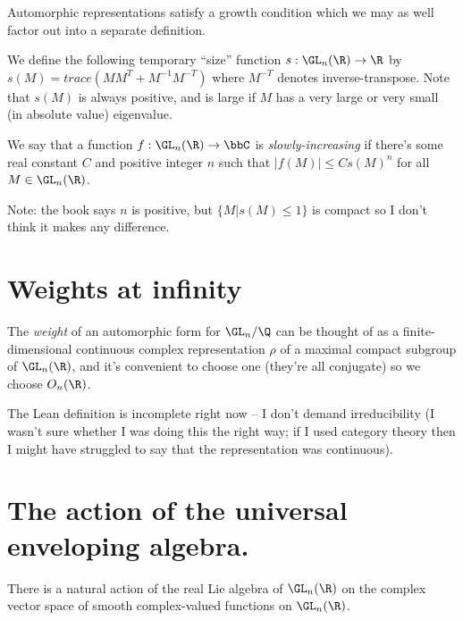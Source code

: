 Automorphic representations satisfy a growth condition which we may as well factor out
into a separate definition.

We define the following temporary ``size'' function $s:\GL_n(\R)\to\R$ by
$s(M)=trace(MM^T+M^{-1}M^{-T})$ where $M^{-T}$ denotes inverse-transpose. Note that
$s(M)$ is always positive, and is large if $M$ has a very large or very small
(in absolute value) eigenvalue.

\begin{definition}
  \label{AutomorphicForm.GLn.IsSlowlyIncreasing}
  \leanok
  We say that a function $f:\GL_n(\R)\to\bbC$ is \emph{slowly-increasing}
  if there's some real constant $C$ and positive integer $n$ such that $|f(M)|\leq Cs(M)^n$
  for all $M\in\GL_n(\R)$.
\end{definition}

Note: the book says $n$ is positive, but $\{M|s(M)\leq 1\}$ is compact so I don't
think it makes any difference.

\section{Weights at infinity}

\begin{definition}
  \label{AutomorphicForm.GLn.Weight}

The \emph{weight} of an automorphic form for $\GL_n/\Q$ can be thought of as a finite-dimensional
continuous complex representation $\rho$ of a maximal compact subgroup of $\GL_n(\R)$,
and it's convenient to choose one (they're all conjugate) so we choose $O_n(\R)$.
\end{definition}

The Lean definition is incomplete right now -- I don't demand irreducibility
(I wasn't sure whether I was doing this the right way; if I used category theory
then I might have struggled to say that the representation was continuous).


\section{The action of the universal enveloping algebra.}

\begin{definition}
  \label{instLieAlgebraAction}
There is a natural action of the real Lie algebra of $\GL_n(\R)$ on the complex vector space of
smooth complex-valued functions on $\GL_n(\R)$.
\end{definition}

